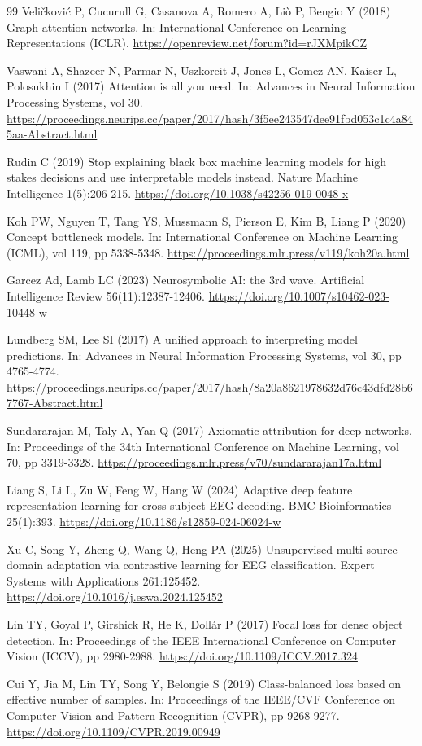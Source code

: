 \documentclass[pdflatex,sn-basic,Numbered]{sn-jnl}
\begin{document}
\begin{thebibliography}{99}
 Veli\v{c}kovi\'c P, Cucurull G, Casanova A, Romero A, Li\`o P, Bengio Y (2018) Graph attention networks. In: International Conference on Learning Representations (ICLR). \url{https://openreview.net/forum?id=rJXMpikCZ}

 Vaswani A, Shazeer N, Parmar N, Uszkoreit J, Jones L, Gomez AN, Kaiser L, Polosukhin I (2017) Attention is all you need. In: Advances in Neural Information Processing Systems, vol 30. \url{https://proceedings.neurips.cc/paper/2017/hash/3f5ee243547dee91fbd053c1c4a845aa-Abstract.html}

 Rudin C (2019) Stop explaining black box machine learning models for high stakes decisions and use interpretable models instead. Nature Machine Intelligence 1(5):206-215. \url{https://doi.org/10.1038/s42256-019-0048-x}

 Koh PW, Nguyen T, Tang YS, Mussmann S, Pierson E, Kim B, Liang P (2020) Concept bottleneck models. In: International Conference on Machine Learning (ICML), vol 119, pp 5338-5348. \url{https://proceedings.mlr.press/v119/koh20a.html}

 Garcez Ad, Lamb LC (2023) Neurosymbolic AI: the 3rd wave. Artificial Intelligence Review 56(11):12387-12406. \url{https://doi.org/10.1007/s10462-023-10448-w}

 Lundberg SM, Lee SI (2017) A unified approach to interpreting model predictions. In: Advances in Neural Information Processing Systems, vol 30, pp 4765-4774. \url{https://proceedings.neurips.cc/paper/2017/hash/8a20a8621978632d76c43dfd28b67767-Abstract.html}

 Sundararajan M, Taly A, Yan Q (2017) Axiomatic attribution for deep networks. In: Proceedings of the 34th International Conference on Machine Learning, vol 70, pp 3319-3328. \url{https://proceedings.mlr.press/v70/sundararajan17a.html}

 Liang S, Li L, Zu W, Feng W, Hang W (2024) Adaptive deep feature representation learning for cross-subject EEG decoding. BMC Bioinformatics 25(1):393. \url{https://doi.org/10.1186/s12859-024-06024-w}

 Xu C, Song Y, Zheng Q, Wang Q, Heng PA (2025) Unsupervised multi-source domain adaptation via contrastive learning for EEG classification. Expert Systems with Applications 261:125452. \url{https://doi.org/10.1016/j.eswa.2024.125452}

 Lin TY, Goyal P, Girshick R, He K, Doll\'ar P (2017) Focal loss for dense object detection. In: Proceedings of the IEEE International Conference on Computer Vision (ICCV), pp 2980-2988. \url{https://doi.org/10.1109/ICCV.2017.324}

 Cui Y, Jia M, Lin TY, Song Y, Belongie S (2019) Class-balanced loss based on effective number of samples. In: Proceedings of the IEEE/CVF Conference on Computer Vision and Pattern Recognition (CVPR), pp 9268-9277. \url{https://doi.org/10.1109/CVPR.2019.00949}

\end{thebibliography}
\end{document}
